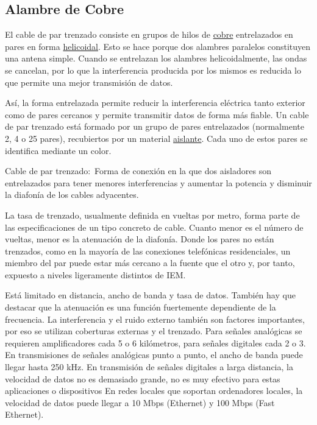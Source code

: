 \documentclass[a4paper]{article}
\begin{document}
\subsection{Alambre de Cobre}
El cable de par trenzado consiste en grupos de hilos
de \href{https://es.wikipedia.org/wiki/Cobre}{cobre} entrelazados en pares en forma \href{https://es.wikipedia.org/wiki/H\%C3\%A9lice_(geometr\%C3\%ADa)}{helicoidal}.
Esto se hace porque dos alambres paralelos constituyen una antena simple. Cuando se entrelazan los alambres helicoidalmente, las ondas se cancelan, por lo que la interferencia producida por los mismos es reducida lo que permite una mejor transmisión de datos.

Así, la forma entrelazada permite reducir la interferencia eléctrica
tanto exterior como de pares cercanos y permite transmitir datos de
forma más fiable. Un cable de par trenzado está formado por un grupo de
pares entrelazados (normalmente 2, 4 o 25 pares), recubiertos por un
material \href{https://es.wikipedia.org/wiki/Aislamiento_el\%C3\%A9ctrico}{aislante}.
Cada uno de estos pares se identifica mediante un color.

Cable de par trenzado:~Forma de conexión en la que dos aisladores son
entrelazados para tener menores interferencias y aumentar la potencia y
disminuir la diafonía de los cables adyacentes.

La tasa de trenzado, usualmente definida en vueltas por metro, forma
parte de las especificaciones de un tipo concreto de cable. Cuanto menor
es el número de vueltas, menor es la atenuación de la diafonía. Donde
los pares no están trenzados, como en la mayoría de las conexiones
telefónicas residenciales, un miembro del par puede estar más cercano a
la fuente que el otro y, por tanto, expuesto a niveles ligeramente
distintos de IEM.

Está limitado en distancia, ancho de banda y tasa de datos. También hay
que destacar que la atenuación es una función fuertemente dependiente de
la frecuencia. La interferencia y el ruido externo también son factores
importantes, por eso se utilizan coberturas externas y el trenzado. Para
señales analógicas se requieren amplificadores cada 5 o 6 kilómetros,
para señales digitales cada 2 o 3. En transmisiones de señales
analógicas punto a punto, el ancho de banda puede llegar hasta 250 kHz.
En transmisión de señales digitales a larga distancia, la velocidad de
datos no es demasiado grande, no es muy efectivo para estas aplicaciones
o dispositivos En redes locales que soportan ordenadores locales, la
velocidad de datos puede llegar a 10 Mbps (Ethernet) y 100 Mbps (Fast
Ethernet).
\end{document}

